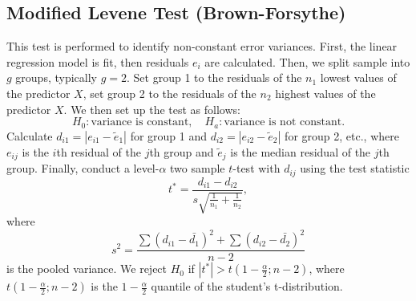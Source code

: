 \documentclass{mcmthesis}
\begin{document}
\begin{appendices}

\section{Modified Levene Test (Brown-Forsythe)}\label{ap:mlt}

This test is performed to identify non-constant error variances. First, the linear regression model is fit, then residuals $e_i$ are calculated. Then, we split sample into $g$ groups, typically $g = 2$. Set group 1 to the residuals of the $n_1$ lowest values of the predictor $X$, set group 2 to the residuals of the $n_2$ highest values of the predictor $X$. We then set up the test as follows:
\[
	H_0 : \text{variance is constant}, \quad H_a : \text{variance is not constant}.
\]
Calculate $d_{i1} = |e_{i1} - \tilde{e}_{1}|$ for group 1 and $d_{i2} = |e_{i2} - \tilde{e}_{2}|$ for group 2, etc., where $e_{ij}$ is the $i$th residual of the $j$th group and $\tilde{e}_j$ is the median residual of the $j$th group. Finally, conduct a level-$\alpha$ two sample $t$-test with $d_{ij}$ using the test statistic
\[
t^* = \frac{d_{i1} - d_{i2}}{s\sqrt{\frac{1}{n_1} + \frac{1}{n_2}}},
\]
where
\[
s^2 = \frac{\sum (d_{i1} - \bar{d_1})^2 + \sum (d_{i2} - \bar{d_2})^2}{n-2}
\]
is the pooled variance. We reject $H_0$ if $|t^*| > t\left( 1-\frac{\alpha}{2} ; n - 2 \right)$, where $t\left( 1-\frac{\alpha}{2} ; n - 2 \right)$ is the $1-\frac{\alpha}{2}$ quantile of the student's t-distribution.

\end{appendices}

\AImatter

\begin{ReportAiUse}{9}

\end{ReportAiUse}
\end{document}
